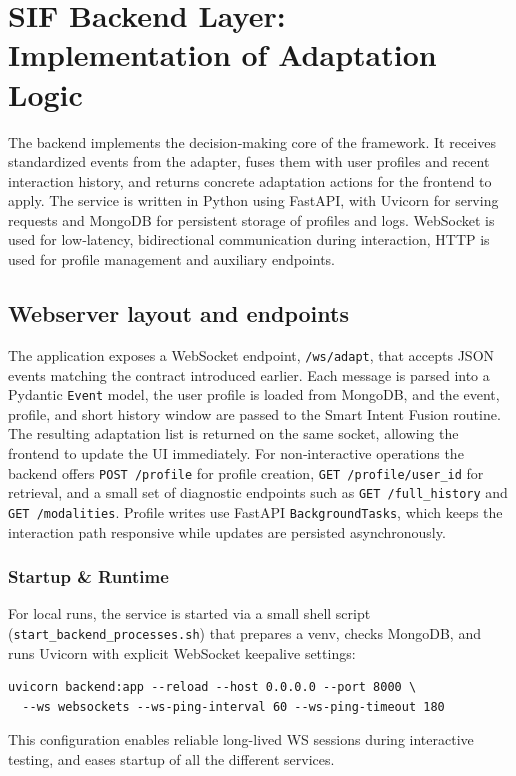 \section{SIF Backend Layer: Implementation of Adaptation Logic}
The backend implements the decision‑making core of the framework. It receives standardized events from the adapter, fuses them with user profiles and recent interaction history, and returns concrete adaptation actions for the frontend to apply. The service is written in Python using FastAPI, with Uvicorn for serving requests and MongoDB for persistent storage of profiles and logs. WebSocket is used for low‑latency, bidirectional communication during interaction, HTTP is used for profile management and auxiliary endpoints.

\subsection{Webserver layout and endpoints}
The application exposes a WebSocket endpoint, \texttt{/ws/adapt}, that accepts JSON events matching the contract introduced earlier. Each message is parsed into a Pydantic \texttt{Event} model, the user profile is loaded from MongoDB, and the event, profile, and short history window are passed to the Smart Intent Fusion routine. The resulting adaptation list is returned on the same socket, allowing the frontend to update the UI immediately. For non‑interactive operations the backend offers \texttt{POST /profile} for profile creation, \texttt{GET /profile/{user\_id}} for retrieval, and a small set of diagnostic endpoints such as \texttt{GET /full\_history} and \texttt{GET /modalities}. Profile writes use FastAPI \texttt{BackgroundTasks}, which keeps the interaction path responsive while updates are persisted asynchronously.

\subsubsection*{Startup \& Runtime}
For local runs, the service is started via a small shell script (\texttt{start\_backend\_processes.sh}) that prepares a venv, checks MongoDB, and runs Uvicorn with explicit WebSocket keepalive settings:
\begin{lstlisting}[basicstyle=\ttfamily\small,caption={Backend startup (excerpt)}]
uvicorn backend:app --reload --host 0.0.0.0 --port 8000 \
  --ws websockets --ws-ping-interval 60 --ws-ping-timeout 180
\end{lstlisting}
This configuration enables reliable long-lived WS sessions during interactive testing, and eases startup of all the different services.

